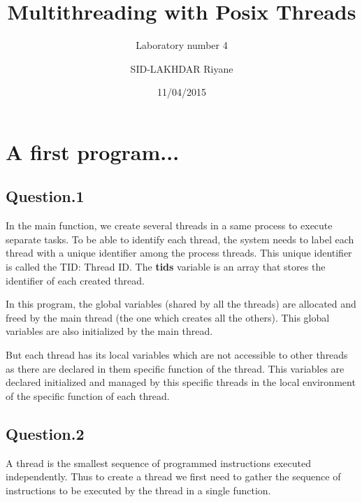 \documentclass[a4paper,10pt]{article}
\title{Multithreading with Posix Threads}
\subtitle{Laboratory number 4}
\author{SID-LAKHDAR Riyane}
\date{11/04/2015}
\begin{document}


\maketitle










\section{A first program...}
    \subsection{Question.1}
    In the main function, we create several threads in a same process to execute separate tasks.    To be able to identify each thread, the system needs to label each thread with a unique identifier among the process threads.  This unique identifier is called the TID: Thread ID.\newline
    The \textbf{tids} variable is an array that stores the identifier of each created thread.\newline

    In this program, the global variables (shared by all the threads) are allocated and freed by the main thread (the one which creates all the others).  
    This global variables are also initialized by the main thread.\newline

    But each thread has its local variables which are not accessible to other threads as there are declared in them specific function of the thread. This variables are declared initialized and managed by this specific threads in the local environment of the specific function of each thread.
    
    \subsection{Question.2}
    A thread is the smallest sequence of programmed instructions executed independently.  Thus to create a thread we first need to gather the sequence of instructions to be executed by the thread in a single function.\newline
    
\end{document}
